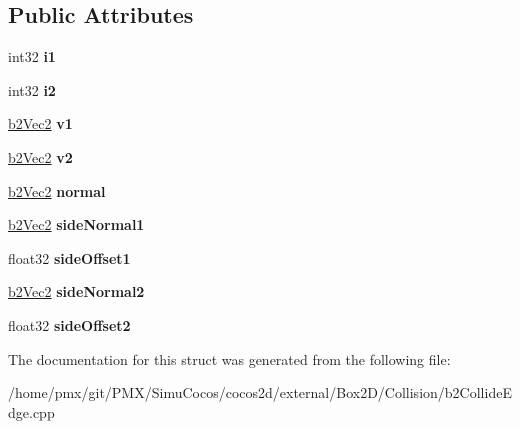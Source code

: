 \subsection*{Public Attributes}
\begin{DoxyCompactItemize}
\item 
\mbox{\label{structb2ReferenceFace_a987d346858f5c1dd1de0dfddab779324}} 
int32 {\bfseries i1}
\item 
\mbox{\label{structb2ReferenceFace_a838ab3e4a81b71cfaa450eb214584353}} 
int32 {\bfseries i2}
\item 
\mbox{\label{structb2ReferenceFace_a20165b58f2e81b78ed3a099ef85737ac}} 
\hyperlink{structb2Vec2}{b2\+Vec2} {\bfseries v1}
\item 
\mbox{\label{structb2ReferenceFace_aa89eb5b51e9ee680b97c33041658f9ab}} 
\hyperlink{structb2Vec2}{b2\+Vec2} {\bfseries v2}
\item 
\mbox{\label{structb2ReferenceFace_a4ba73696920306d3c8fecc35a4433029}} 
\hyperlink{structb2Vec2}{b2\+Vec2} {\bfseries normal}
\item 
\mbox{\label{structb2ReferenceFace_a478026ee3fa0d8d1349b01928eb9e947}} 
\hyperlink{structb2Vec2}{b2\+Vec2} {\bfseries side\+Normal1}
\item 
\mbox{\label{structb2ReferenceFace_a7e2a902ed8f499fbb4305d51ce687876}} 
float32 {\bfseries side\+Offset1}
\item 
\mbox{\label{structb2ReferenceFace_ad272f9369fbc1d28f60f77defd757dbd}} 
\hyperlink{structb2Vec2}{b2\+Vec2} {\bfseries side\+Normal2}
\item 
\mbox{\label{structb2ReferenceFace_a7fa70d9f4bfc4cdf792408ffe204d017}} 
float32 {\bfseries side\+Offset2}
\end{DoxyCompactItemize}


The documentation for this struct was generated from the following file\+:\begin{DoxyCompactItemize}
\item 
/home/pmx/git/\+P\+M\+X/\+Simu\+Cocos/cocos2d/external/\+Box2\+D/\+Collision/b2\+Collide\+Edge.\+cpp\end{DoxyCompactItemize}
